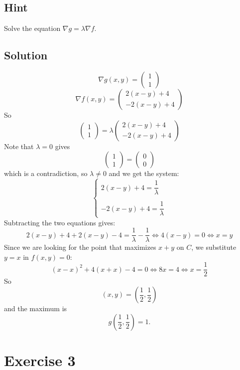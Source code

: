 \documentclass[a4paper,10pt]{article}
\begin{document}
\subsection{Hint}
Solve the equation $\nabla g = \lambda\nabla f$.

\subsection{Solution}
\[
    \nabla g(x,y) = \begin{pmatrix} 1 \\ 1 \end{pmatrix}
\]
\[
    \nabla f(x,y) = \begin{pmatrix} 2(x-y) + 4 \\ -2(x-y) + 4 \end{pmatrix}
\]
So
\[
    \begin{pmatrix} 1 \\ 1 \end{pmatrix} = \lambda \begin{pmatrix} 2(x-y) + 4 \\ -2(x-y) + 4 \end{pmatrix}
\]
Note that $\lambda = 0$ gives
\[
    \begin{pmatrix} 1 \\ 1 \end{pmatrix} = \begin{pmatrix} 0 \\ 0 \end{pmatrix}
\]
which is a contradiction, so $\lambda \neq 0$ and we get the system:
\[
    \begin{cases}
        2(x-y) + 4 = \dfrac{1}{\lambda} \\ \\
        -2(x-y) + 4 = \dfrac{1}{\lambda}
    \end{cases}
\]
Subtracting the two equations gives:
\[
    2(x-y) + 4 + 2(x-y) - 4 =  \frac{1}{\lambda} - \frac{1}{\lambda} \iff 4(x-y) = 0 \iff x = y
\]
Since we are looking for the point that maximizes $x+y$ on $C$, we substitute $y=x$ in $f(x,y)=0$:
\[
    (x-x)^2 + 4(x+x) - 4 = 0 \iff 8x = 4 \iff x = \frac{1}{2}
\]
So
\[
    (x, y) = \left(\frac{1}{2}, \frac{1}{2}\right)
\]
and the maximum is
\[
    g\left(\frac{1}{2}, \frac{1}{2}\right) = 1.
\]

\clearpage

\section{Exercise 3}
\end{document}
